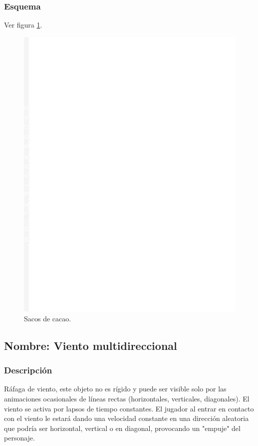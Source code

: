 \documentclass[11pt,letterpaper]{article}
\begin{document}
	\subsubsection{Esquema}
	Ver figura \ref{fig:bolasN}.
	\begin{figure}
		\centering
		\includegraphics[height=0.2 \textheight]{Imagenes/bolasN}
		\caption{Sacos de cacao.}
		\label{fig:bolasN}
	\end{figure}
		\subsection{Nombre: Viento multidireccional}\label{obs.vientoM}
	\subsubsection{Descripción}
		Ráfaga de viento, este objeto no es rígido y puede ser visible solo por las animaciones ocasionales de líneas rectas (horizontales, verticales, diagonales). El viento se activa por lapsos de tiempo constantes. El jugador al entrar en contacto con el viento le estará dando una velocidad constante en una dirección aleatoria que podría ser horizontal, vertical o en diagonal, provocando un "empuje" del personaje. 
\end{document}
